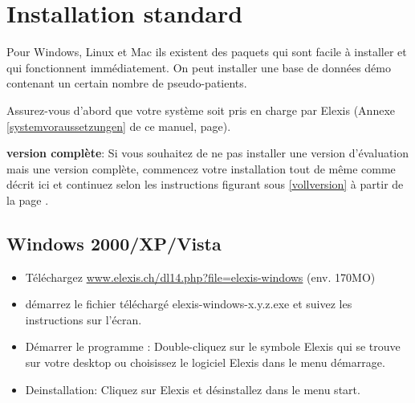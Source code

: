 
\section{Installation standard}
\label{easyistall}
Pour Windows, Linux et Mac ils existent des paquets qui sont facile à installer et qui fonctionnent immédiatement. On peut installer une base de données démo contenant un certain nombre de pseudo-patients.


Assurez-vous d'abord que votre système soit pris en charge par Elexis (Annexe \ref{systemvoraussetzungen} de ce manuel, page\pageref{systemvoraussetzungen}).\par
{}
\textbf{version complète}: Si vous souhaitez de ne pas installer une version d'évaluation mais une version complète, commencez votre installation tout de même comme décrit ici et continuez selon les instructions figurant sous \ref{vollversion} à partir de la page \pageref{vollversion}.
\subsection{Windows 2000/XP/Vista}
\begin{itemize}
	\item Téléchargez  \href{http://www.elexis.ch/dl14.php?file=elexis-windows}{www.elexis.ch/dl14.php?file=elexis-windows} (env. 170MO)
	\item démarrez le fichier téléchargé  elexis-windows-x.y.z.exe et suivez les instructions sur l'écran.
    \item Démarrer le programme : Double-cliquez sur le symbole \glqq Elexis\grqq{} qui se trouve sur  votre desktop ou choisissez le logiciel \glqq Elexis\grqq{} dans le menu démarrage.
	\item Deinstallation: Cliquez sur \glqq Elexis et désinstallez dans le menu start.
\end{itemize}

